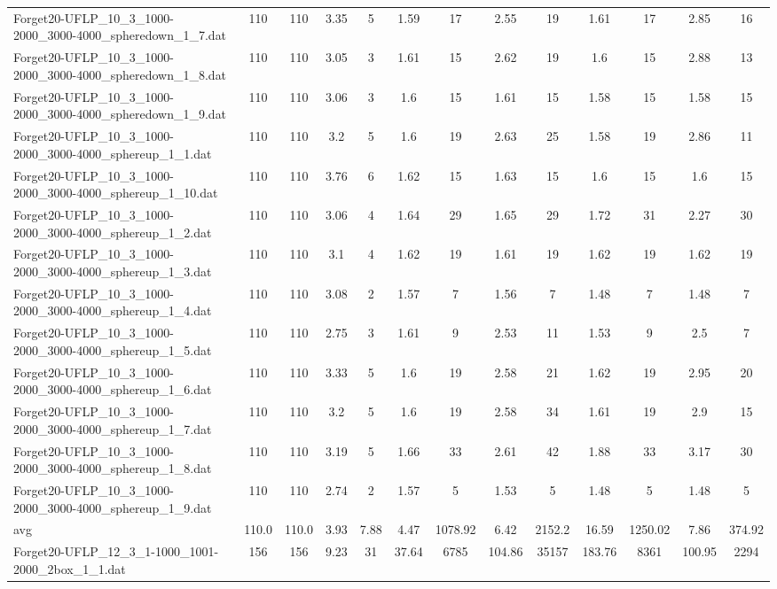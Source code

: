 \begin{table}[!ht]
{\begin{tabular}{lcccccccccccc}
Forget20-UFLP\_10\_3\_1000-2000\_3000-4000\_spheredown\_1\_7.dat & 110 & 110 & 3.35 & 5 & 1.59 & 17 & 2.55 & 19 & 1.61 & 17 & 2.85 & 16 \\
Forget20-UFLP\_10\_3\_1000-2000\_3000-4000\_spheredown\_1\_8.dat & 110 & 110 & 3.05 & 3 & 1.61 & 15 & 2.62 & 19 & 1.6 & 15 & 2.88 & 13 \\
Forget20-UFLP\_10\_3\_1000-2000\_3000-4000\_spheredown\_1\_9.dat & 110 & 110 & 3.06 & 3 & 1.6 & 15 & 1.61 & 15 & 1.58 & 15 & 1.58 & 15 \\
Forget20-UFLP\_10\_3\_1000-2000\_3000-4000\_sphereup\_1\_1.dat & 110 & 110 & 3.2 & 5 & 1.6 & 19 & 2.63 & 25 & 1.58 & 19 & 2.86 & 11 \\
Forget20-UFLP\_10\_3\_1000-2000\_3000-4000\_sphereup\_1\_10.dat & 110 & 110 & 3.76 & 6 & 1.62 & 15 & 1.63 & 15 & 1.6 & 15 & 1.6 & 15 \\
Forget20-UFLP\_10\_3\_1000-2000\_3000-4000\_sphereup\_1\_2.dat & 110 & 110 & 3.06 & 4 & 1.64 & 29 & 1.65 & 29 & 1.72 & 31 & 2.27 & 30 \\
Forget20-UFLP\_10\_3\_1000-2000\_3000-4000\_sphereup\_1\_3.dat & 110 & 110 & 3.1 & 4 & 1.62 & 19 & 1.61 & 19 & 1.62 & 19 & 1.62 & 19 \\
Forget20-UFLP\_10\_3\_1000-2000\_3000-4000\_sphereup\_1\_4.dat & 110 & 110 & 3.08 & 2 & 1.57 & 7 & 1.56 & 7 & 1.48 & 7 & 1.48 & 7 \\
Forget20-UFLP\_10\_3\_1000-2000\_3000-4000\_sphereup\_1\_5.dat & 110 & 110 & 2.75 & 3 & 1.61 & 9 & 2.53 & 11 & 1.53 & 9 & 2.5 & 7 \\
Forget20-UFLP\_10\_3\_1000-2000\_3000-4000\_sphereup\_1\_6.dat & 110 & 110 & 3.33 & 5 & 1.6 & 19 & 2.58 & 21 & 1.62 & 19 & 2.95 & 20 \\
Forget20-UFLP\_10\_3\_1000-2000\_3000-4000\_sphereup\_1\_7.dat & 110 & 110 & 3.2 & 5 & 1.6 & 19 & 2.58 & 34 & 1.61 & 19 & 2.9 & 15 \\
Forget20-UFLP\_10\_3\_1000-2000\_3000-4000\_sphereup\_1\_8.dat & 110 & 110 & 3.19 & 5 & 1.66 & 33 & 2.61 & 42 & 1.88 & 33 & 3.17 & 30 \\
Forget20-UFLP\_10\_3\_1000-2000\_3000-4000\_sphereup\_1\_9.dat & 110 & 110 & 2.74 & 2 & 1.57 & 5 & 1.53 & 5 & 1.48 & 5 & 1.48 & 5 \\
\hline avg & 110.0 & 110.0 & 3.93& 7.88 & 4.47& 1078.92 & 6.42& 2152.2 & 16.59& 1250.02 & 7.86& 374.92\\ \hline
Forget20-UFLP\_12\_3\_1-1000\_1001-2000\_2box\_1\_1.dat & 156 & 156 & 9.23 & 31 & 37.64 & 6785 & 104.86 & 35157 & 183.76 & 8361 & 100.95 & 2294 \\

\end{tabular}}
\end{table}

